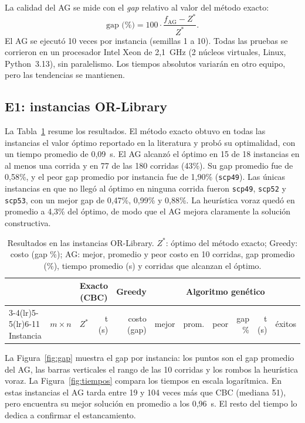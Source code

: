 \documentclass[11pt,a4paper]{article}
\begin{document}
La calidad del AG se mide con el \emph{gap} relativo al valor del método exacto:
\[
\text{gap (\%)}=100\cdot\frac{f_{\text{AG}}-Z^\ast}{Z^\ast}.
\]
El AG se ejecutó 10 veces por instancia (semillas 1 a 10). Todas las pruebas se corrieron en un
procesador Intel Xeon de 2,1~GHz (2 núcleos virtuales, Linux, Python~3.13), sin paralelismo. Los
tiempos absolutos variarán en otro equipo, pero las tendencias se mantienen.

\subsection{E1: instancias OR-Library}
La Tabla~\ref{tab:e1} resume los resultados. El método exacto obtuvo en todas las instancias el valor
óptimo reportado en la literatura y probó su optimalidad, con un tiempo promedio de 0,09~s. El AG
alcanzó el óptimo en 15 de 18 instancias en al menos una corrida y en 77 de las 180 corridas
(43\%). Su gap promedio fue de 0,58\%, y el peor gap promedio por instancia fue de 1,90\%
(\texttt{scp49}). Las únicas instancias en que no llegó al óptimo en ninguna corrida fueron
\texttt{scp49}, \texttt{scp52} y \texttt{scp53}, con un mejor gap de 0,47\%, 0,99\% y 0,88\%. La
heurística voraz quedó en promedio a 4,3\% del óptimo, de modo que el AG mejora claramente la
solución constructiva.

\begin{table}[H]
\centering\scriptsize
\setlength{\tabcolsep}{3.5pt}
\caption{Resultados en las instancias OR-Library. $Z^\ast$: óptimo del método exacto; Greedy: costo
(gap \%); AG: mejor, promedio y peor costo en 10 corridas, gap promedio (\%), tiempo promedio (s) y
corridas que alcanzan el óptimo.}\label{tab:e1}
\begin{tabular}{l c r r r r r r r r c}
\toprule
& & \multicolumn{2}{c}{Exacto (CBC)} & \multicolumn{1}{c}{Greedy} & \multicolumn{6}{c}{Algoritmo genético} \\
\cmidrule(lr){3-4}\cmidrule(lr){5-5}\cmidrule(lr){6-11}
Instancia & $m\times n$ & $Z^\ast$ & t (s) & costo (gap) & mejor & prom. & peor & gap \% & t (s) & éxitos \\
\midrule

\end{tabular}
\end{table}

La Figura~\ref{fig:gap} muestra el gap por instancia: los puntos son el gap promedio del AG, las
barras verticales el rango de las 10 corridas y los rombos la heurística voraz. La
Figura~\ref{fig:tiempos} compara los tiempos en escala logarítmica. En estas instancias el AG tarda entre 19 y 104 veces más que CBC (mediana 51), pero encuentra su mejor solución en promedio a los 0,96~s. El resto del
tiempo lo dedica a confirmar el estancamiento.
\end{document}
